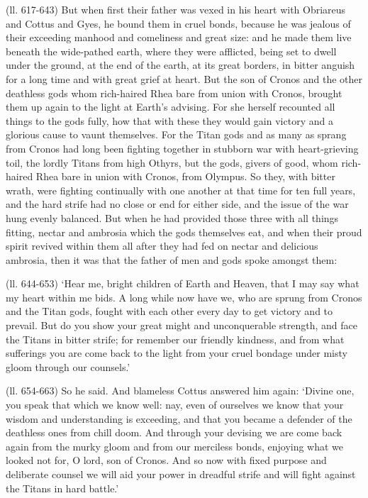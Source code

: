 (ll. 617-643) But when first their father was vexed in his heart with Obriareus
and Cottus and Gyes, he bound them in cruel bonds, because he was jealous of
their exceeding manhood and comeliness and great size: and he made them live
beneath the wide-pathed earth, where they were afflicted, being set to dwell
under the ground, at the end of the earth, at its great borders, in bitter
anguish for a long time and with great grief at heart. But the son of Cronos
and the other deathless gods whom rich-haired Rhea bare from union with Cronos,
brought them up again to the light at Earth’s advising. For she herself
recounted all things to the gods fully, how that with these they would gain
victory and a glorious cause to vaunt themselves. For the Titan gods and as
many as sprang from Cronos had long been fighting together in stubborn war with
heart-grieving toil, the lordly Titans from high Othyrs, but the gods, givers
of good, whom rich-haired Rhea bare in union with Cronos, from Olympus. So
they, with bitter wrath, were fighting continually with one another at that
time for ten full years, and the hard strife had no close or end for either
side, and the issue of the war hung evenly balanced. But when he had provided
those three with all things fitting, nectar and ambrosia which the gods
themselves eat, and when their proud spirit revived within them all after they
had fed on nectar and delicious ambrosia, then it was that the father of men
and gods spoke amongst them:

(ll. 644-653) ‘Hear me, bright children of Earth and Heaven, that I may
say what my heart within me bids. A long while now have we, who are sprung from
Cronos and the Titan gods, fought with each other every day to get victory and
to prevail. But do you show your great might and unconquerable strength, and
face the Titans in bitter strife; for remember our friendly kindness, and from
what sufferings you are come back to the light from your cruel bondage under
misty gloom through our counsels.’

(ll. 654-663) So he said. And blameless Cottus answered him again:
‘Divine one, you speak that which we know well: nay, even of ourselves we
know that your wisdom and understanding is exceeding, and that you became a
defender of the deathless ones from chill doom. And through your devising we
are come back again from the murky gloom and from our merciless bonds, enjoying
what we looked not for, O lord, son of Cronos. And so now with fixed purpose
and deliberate counsel we will aid your power in dreadful strife and will fight
against the Titans in hard battle.’

